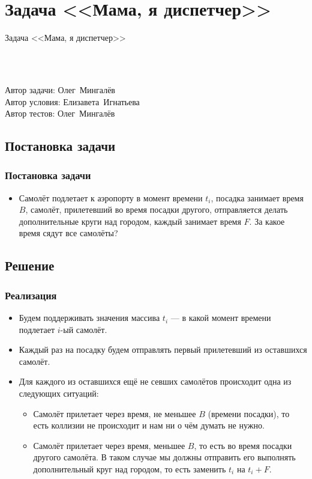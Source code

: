 \section{Задача <<Мама, я диспетчер>>}


\begin{frame}
    \begin{center}
        \Huge Задача <<Мама, я диспетчер>>
    \end{center}
    ~\\~\\
    \begin{center}
        Автор задачи: Олег~Мингалёв\\
        Автор условия: Елизавета~Игнатьева\\
        Автор тестов: Олег~Мингалёв
    \end{center}
\end{frame}

\subsection{Постановка задачи}

\begin{frame}
    \frametitle{Постановка задачи}

    \begin{itemize}
        \item Самолёт подлетает к аэропорту в момент времени $t_i$, посадка занимает время $B$, самолёт, прилетевший во время посадки другого, отправляется делать дополнительные круги над городом, каждый занимает время $F$. За какое время сядут все самолёты?
    \end{itemize}
\end{frame}

\subsection{Решение}

\begin{frame}
    \frametitle{Реализация}

    \begin{itemize}
        \item Будем поддерживать значения массива $t_i$ --- в какой момент времени подлетает $i$-ый самолёт.
        \item Каждый раз на посадку будем отправлять первый прилетевший из оставшихся самолёт.
        \item Для каждого из оставшихся ещё не севших самолётов происходит одна из следующих ситуаций:
        \begin{itemize}
            \item Самолёт прилетает через время, не меньшее $B$ (времени посадки), то есть коллизии не происходит и нам ни о чём думать не нужно.
            \item Самолёт прилетает через время, меньшее $B$, то есть во время посадки другого самолёта. В таком случае мы должны отправить его выполнять дополнительный круг над городом, то есть заменить $t_i$ на $t_i + F$.
        \end{itemize}
    \end{itemize}
\end{frame}

